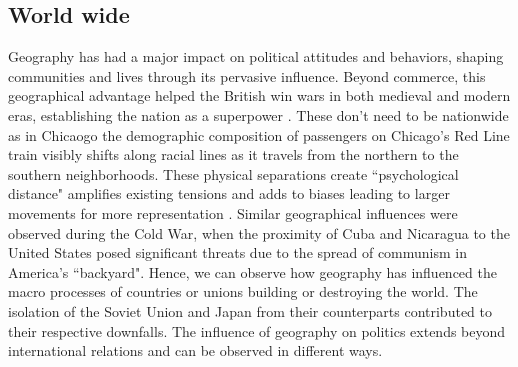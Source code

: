 \subsection{World wide}

Geography has had a major impact on political attitudes and behaviors, shaping communities and lives through its pervasive influence. Beyond commerce, this geographical advantage helped the British win wars in both medieval and modern eras, establishing the nation as a superpower \citep{young1987geography}. These don't need to be nationwide as in Chicaogo the demographic composition of passengers on Chicago's Red Line train visibly shifts along racial lines as it travels from the northern to the southern neighborhoods.  These physical separations create ``psychological distance" amplifies existing tensions and adds to biases leading to larger movements for more representation \citep{kasperson1965toward}. Similar geographical influences were observed during the Cold War, when the proximity of Cuba and Nicaragua to the United States posed significant threats due to the spread of communism in America's ``backyard". Hence, we can observe how geography has influenced the macro processes of countries or unions building or destroying the world.  The isolation of the Soviet Union and Japan from their counterparts contributed to their respective downfalls. The influence of geography on politics extends beyond international relations and can be observed in different ways.

\vspace{0.3cm}

